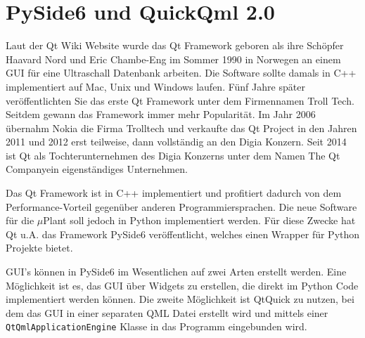 \newpage
\section{PySide6 und QuickQml 2.0}

Laut der Qt Wiki Website \cite{QtWikiHistory} wurde das Qt Framework geboren als ihre Schöpfer Haavard Nord und
Eric Chambe-Eng im Sommer 1990 in Norwegen an einem GUI für eine Ultraschall Datenbank arbeiten.
Die Software sollte damals in C++ implementiert auf Mac, Unix und Windows laufen.
Fünf Jahre später veröffentlichten Sie das erste Qt Framework unter dem Firmennamen Troll Tech.
Seitdem gewann das Framework immer mehr Popularität.
Im Jahr 2006 übernahm Nokia die Firma Trolltech und verkaufte das Qt Project in den Jahren 2011 und 2012 erst teilweise,
dann vollständig an den Digia Konzern.
Seit 2014 ist Qt als Tochterunternehmen des Digia Konzerns unter dem Namen \glqq The Qt Company\grqq ein eigenständiges Unternehmen.

Das Qt Framework ist in C++ implementiert und profitiert dadurch von dem Performance-Vorteil gegenüber anderen
Programmiersprachen.
Die neue Software für die $\mu$Plant soll jedoch in Python implementiert werden.
Für diese Zwecke hat Qt u.A. das Framework PySide6 veröffentlicht, welches einen Wrapper für Python Projekte bietet.

GUI's können in PySide6 im Wesentlichen auf zwei Arten erstellt werden.
Eine Möglichkeit ist es, das GUI über Widgets\cite{pysideQtWidgets} zu erstellen, die direkt im Python Code implementiert werden können.
Die zweite Möglichkeit ist QtQuick \cite{pysideQtQuick} zu nutzen, bei dem das GUI in einer separaten QML Datei erstellt wird und
mittels einer \verb|QtQmlApplicationEngine| Klasse in das Programm eingebunden wird.

